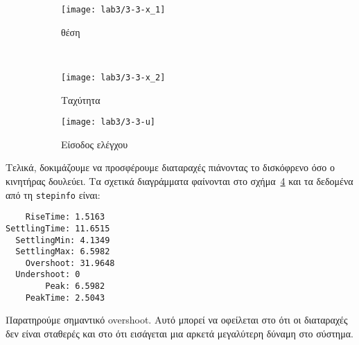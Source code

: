 \begin{figure}[htbp]
  \centering
  \begin{subfigure}[t]{\linewidth}
    \texttt{[image: lab3/3-3-x\_1]}
    \caption{θέση}
    \label{fig:3-3-x_1}
  \end{subfigure}\\
  \begin{subfigure}[t]{0.45\linewidth}
    \texttt{[image: lab3/3-3-x\_2]}
    \caption{Ταχύτητα}
    \label{fig:3-3-x_2}
  \end{subfigure}\hfill
  \begin{subfigure}[t]{0.45\linewidth}
    \texttt{[image: lab3/3-3-u]}
    \caption{Είσοδος ελέγχου}
    \label{fig:3-3-u}
  \end{subfigure}
  \caption[]{}
  \label{fig:3-3}
\end{figure}

Τελικά, δοκιμάζουμε να προσφέρουμε διαταραχές πιάνοντας το δισκόφρενο όσο ο κινητήρας δουλεύει.
Τα σχετικά διαγράμματα φαίνονται στο σχήμα~\ref{fig:3-3} και τα δεδομένα από τη \texttt{stepinfo} είναι:
\begin{code}
\begin{verbatim}
    RiseTime: 1.5163
SettlingTime: 11.6515
  SettlingMin: 4.1349
  SettlingMax: 6.5982
    Overshoot: 31.9648
  Undershoot: 0
        Peak: 6.5982
    PeakTime: 2.5043
\end{verbatim}
\end{code}
Παρατηρούμε σημαντικό overshoot. Αυτό μπορεί να οφείλεται στο ότι οι διαταραχές δεν είναι σταθερές και στο ότι εισάγεται μια
αρκετά μεγαλύτερη δύναμη στο σύστημα.
